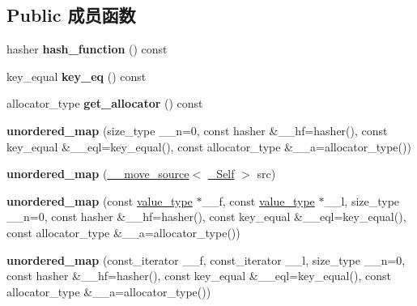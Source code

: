 \subsection*{Public 成员函数}
\begin{DoxyCompactItemize}
\item 
\mbox{\label{classunordered__map_af6ab811010ef5328800bff9ea2bfa0e8}} 
hasher {\bfseries hash\+\_\+function} () const
\item 
\mbox{\label{classunordered__map_ad7e35e703d54fe14d8c07ef98f62aa30}} 
key\+\_\+equal {\bfseries key\+\_\+eq} () const
\item 
\mbox{\label{classunordered__map_a6475f677777c9e0edac4248fc1d0d9ed}} 
allocator\+\_\+type {\bfseries get\+\_\+allocator} () const
\item 
\mbox{\label{classunordered__map_af68be93f651e3488cf4e3044df2013c5}} 
{\bfseries unordered\+\_\+map} (size\+\_\+type \+\_\+\+\_\+n=0, const hasher \&\+\_\+\+\_\+hf=hasher(), const key\+\_\+equal \&\+\_\+\+\_\+eql=key\+\_\+equal(), const allocator\+\_\+type \&\+\_\+\+\_\+a=allocator\+\_\+type())
\item 
\mbox{\label{classunordered__map_aec7635aa4569ba82847f24b32f0c2f3f}} 
{\bfseries unordered\+\_\+map} (\hyperlink{class____move__source}{\+\_\+\+\_\+move\+\_\+source}$<$ \hyperlink{classunordered__map}{\+\_\+\+Self} $>$ src)
\item 
\mbox{\label{classunordered__map_ad73d8859d3c4fbbc48eabc6f49cf2b7a}} 
{\bfseries unordered\+\_\+map} (const \hyperlink{structpair}{value\+\_\+type} $\ast$\+\_\+\+\_\+f, const \hyperlink{structpair}{value\+\_\+type} $\ast$\+\_\+\+\_\+l, size\+\_\+type \+\_\+\+\_\+n=0, const hasher \&\+\_\+\+\_\+hf=hasher(), const key\+\_\+equal \&\+\_\+\+\_\+eql=key\+\_\+equal(), const allocator\+\_\+type \&\+\_\+\+\_\+a=allocator\+\_\+type())
\item 
\mbox{\label{classunordered__map_a60914bdda364e1c6a6d117b6481486f2}} 
{\bfseries unordered\+\_\+map} (const\+\_\+iterator \+\_\+\+\_\+f, const\+\_\+iterator \+\_\+\+\_\+l, size\+\_\+type \+\_\+\+\_\+n=0, const hasher \&\+\_\+\+\_\+hf=hasher(), const key\+\_\+equal \&\+\_\+\+\_\+eql=key\+\_\+equal(), const allocator\+\_\+type \&\+\_\+\+\_\+a=allocator\+\_\+type())

\end{DoxyCompactItemize}
